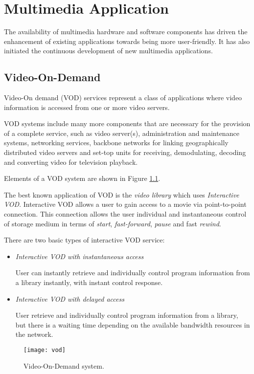 \chapter{Multimedia Application}
The availability of multimedia hardware and software components has driven the enhancement of existing applications towards being more user-friendly. It has also initiated the continuous development of new multimedia applications.

\section{Video-On-Demand}
Video-On demand (VOD) services represent a class of applications where video information is accessed from one or more video servers.

VOD systems include many more components that are necessary for the provision of a complete service, such as video server(s), administration and maintenance systems, networking services, backbone networks for linking geographically distributed video servers and set-top units for receiving, demodulating, decoding and converting video for television playback.

Elements of a VOD system are shown in Figure \ref{fig:vod}.

The best known application of VOD is the \textit{video library} which uses \textit{Interactive VOD}. Interactive VOD allows a user to gain access to a movie via point-to-point
connection. This connection allows the user individual and instantaneous control of storage medium in terms of \textit{start}, \textit{fast-forward}, \textit{pause} and fast \textit{rewind}.

There are two basic types of interactive VOD service:
\begin{itemize}
	\item \textit{Interactive VOD with instantaneous access}
	
	User can instantly retrieve and individually control program information from a library instantly, with instant control response.
	
	\item \textit{Interactive VOD with delayed access}
	
	User retrieve and individually control program information from a library, but there is a waiting time depending on the available bandwidth resources in the network.
\end{itemize}
\begin{figure}[pht!]
	\centering
	\texttt{[image: vod]}
	\caption{Video-On-Demand system.}\label{fig:vod}
\end{figure}

